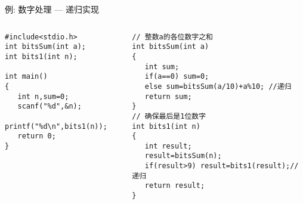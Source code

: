 \begin{frame}{例: 数字处理 --- 递归实现}
\vspace{-0.4cm}
\begin{columns}[T]
\begin{lstlisting}
#include<stdio.h>
int bitsSum(int a);
int bits1(int n);

int main()
{
   int n,sum=0;
   scanf("%d",&n);
   printf("%d\n",bits1(n)); 
   return 0;
} 
\end{lstlisting}
\begin{lstlisting}[frame=leftline]
// 整数a的各位数字之和
int bitsSum(int a)
{
   int sum;
   if(a==0) sum=0;  
   else sum=bitsSum(a/10)+a%10; //递归
   return sum;
}
// 确保最后是1位数字
int bits1(int n)
{
   int result;
   result=bitsSum(n);
   if(result>9) result=bits1(result);//递归
   return result; 
}
\end{lstlisting}
\end{columns}
~\\
\end{frame}

